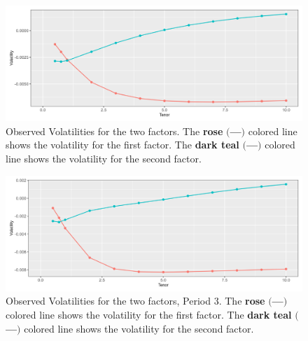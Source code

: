 \vfill


\vfill

\begin{figure}[!htbp]
    \centering
    \includegraphics[width=.95\linewidth]{Figures/Volatilities/zero_coupon_yields_small_volatilities_plot.png}
    
    \caption[Observed Volatilities for the two factors]{Observed Volatilities for the two factors. The \textbf{rose} $\bigl($\textcolor{rose_}{\textbf{---}}$\bigr)$ colored line shows the volatility for the first factor. The \textbf{dark teal} $\bigl($\textcolor{dark_teal_}{\textbf{---}}$\bigr)$ colored line shows the volatility for the second factor.}
    \label{fig:observed volatilites}
\end{figure}

\vfill

\begin{figure}[!htbp]
    \centering
    \includegraphics[width=.95\linewidth]{Figures/Volatilities/zero_coupon_yields_phase_3_small_volatilities_plot.png}
    
    \caption[Observed Volatilities for the two factors, Period 3]{Observed Volatilities for the two factors, Period 3. The \textbf{rose} $\bigl($\textcolor{rose_}{\textbf{---}}$\bigr)$ colored line shows the volatility for the first factor. The \textbf{dark teal} $\bigl($\textcolor{dark_teal_}{\textbf{---}}$\bigr)$ colored line shows the volatility for the second factor.}
    \label{fig:observed volatilites period 3}
\end{figure}

